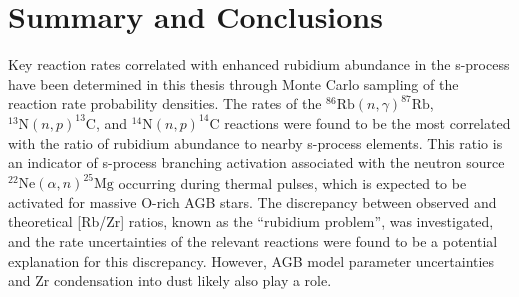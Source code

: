 \chapter{Summary and Conclusions}
\label{chap:conc}




Key reaction rates correlated with enhanced rubidium abundance in the s-process have been determined in this thesis through Monte Carlo sampling of the reaction rate probability densities. The rates of the $^{86}\mathrm{Rb}(n,\gamma)^{87}\mathrm{Rb}$, $^{13}\mathrm{N}(n,p)^{13}\mathrm{C}$, and $^{14}\mathrm{N}(n,p)^{14}\mathrm{C}$ reactions were found to be the most correlated with the ratio of rubidium abundance to nearby s-process elements. This ratio is an indicator of s-process branching activation associated with the neutron source $^{22}\mathrm{Ne}(\alpha,n)^{25}\mathrm{Mg}$ occurring during thermal pulses, which is expected to be activated for massive O-rich AGB stars. The discrepancy between observed and theoretical [Rb/Zr] ratios, known as the ``rubidium problem'', was investigated, and the rate uncertainties of the relevant reactions were found to be a potential explanation for this discrepancy. However, AGB model parameter uncertainties and Zr condensation into dust likely also play a role. 


